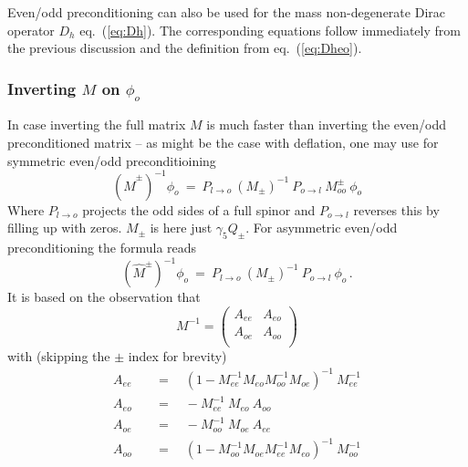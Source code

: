 Even/odd preconditioning can also be used for the mass non-degenerate
Dirac operator $D_h$ eq.~(\ref{eq:Dh}). The corresponding equations
follow immediately from the previous discussion and the definition
from eq.~(\ref{eq:Dheo}).

\subsubsection{Inverting $M$ on $\phi_o$}

In case inverting the full matrix $M$ is much faster than inverting
the even/odd preconditioned matrix -- as might be the case with
deflation, one may use for symmetric even/odd preconditioining
\begin{equation}
  (\hat M^\pm)^{-1}\phi_o\ =\ P_{l\to o}\ (M_\pm)^{-1}\ P_{o\to l}\
  M^\pm_{oo}\ \phi_o
\end{equation}
Where $P_{l\to o}$ projects the odd sides of a full spinor and
$P_{o\to l}$ reverses this by filling up with zeros. $M_\pm$ is here just
$\gamma_5 Q_\pm$. For asymmetric even/odd preconditioning the formula
reads
\begin{equation}
  (\hat M^\pm)^{-1}\phi_o\ =\ P_{l\to o}\ (M_\pm)^{-1}\ P_{o\to l}\
  \phi_o\, .
\end{equation}
It is based on the observation that
\[
M^{-1} = 
\begin{pmatrix}
  A_{ee} & A_{eo} \\
  A_{oe} & A_{oo} \\
\end{pmatrix}
\]
with (skipping the $\pm$ index for brevity)
\[
\begin{split}
  A_{ee}\quad &=\quad (1- M_{ee}^{-1} M_{eo} M_{oo}^{-1} M_{oe})^{-1}\ M_{ee}^{-1} \\
  A_{eo}\quad &=\quad -M_{ee}^{-1}\ M_{eo}\ A_{oo} \\
  A_{oe}\quad &=\quad -M_{oo}^{-1}\ M_{oe}\ A_{ee} \\
  A_{oo}\quad &=\quad (1- M_{oo}^{-1} M_{oe} M_{ee}^{-1} M_{eo})^{-1}\ M_{oo}^{-1} \\
\end{split}
\]
\endinput

